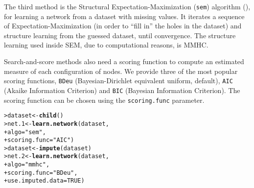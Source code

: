 \documentclass{article}\usepackage[]{graphicx}\usepackage[]{color}
\makeatletter
\newcommand{\hlnum}[1]{\textcolor[rgb]{0.686,0.059,0.569}{#1}}%
\newcommand{\hlstr}[1]{\textcolor[rgb]{0.192,0.494,0.8}{#1}}%
\newcommand{\hlstd}[1]{\textcolor[rgb]{0.345,0.345,0.345}{#1}}%
\newcommand{\hlkwb}[1]{\textcolor[rgb]{0.69,0.353,0.396}{#1}}%
\newcommand{\hlkwc}[1]{\textcolor[rgb]{0.333,0.667,0.333}{#1}}%
\newcommand{\hlkwd}[1]{\textcolor[rgb]{0.737,0.353,0.396}{\textbf{#1}}}%
\newenvironment{kframe}{%
 \def\at@end@of@kframe{}%
 \ifinner\ifhmode%
  \def\at@end@of@kframe{\end{minipage}}%
  \begin{minipage}{\columnwidth}%
 \fi\fi%
 \def\FrameCommand##1{\hskip\@totalleftmargin \hskip-\fboxsep
 \colorbox{shadecolor}{##1}\hskip-\fboxsep
     \hskip-\linewidth \hskip-\@totalleftmargin \hskip\columnwidth}%
 \MakeFramed {\advance\hsize-\width
   \@totalleftmargin\z@ \linewidth\hsize
   \@setminipage}}%
 {\par\unskip\endMakeFramed%
 \at@end@of@kframe}
\newenvironment{knitrout}{}{} %
\makeatother
\begin{document}
The third method is the Structural Expectation-Maximization (\texttt{sem}) algorithm (\citet{friedman1997learning,friedman1998bayesian}),
for learning a network from a dataset with missing values. It iterates a sequence of Expectation-Maximization (in order to ``fill in''
the holes in the dataset) and structure learning from the guessed dataset, until convergence. The structure learning used inside SEM,
due to computational reasons, is MMHC.

Search-and-score methods also need a scoring function to compute an estimated measure of each configuration of nodes.
We provide three of the most popular scoring functions, \texttt{BDeu} (Bayesian-Dirichlet equivalent uniform, default),
\texttt{AIC} (Akaike Information Criterion) and \texttt{BIC} (Bayesian Information Criterion). The scoring function
can be chosen using the \texttt{scoring.func} parameter.

\begin{knitrout}
\color{fgcolor}\begin{kframe}
\begin{alltt}
\hlstd{> }\hlstd{dataset} \hlkwb{<-} \hlkwd{child}\hlstd{()}
\hlstd{> }\hlstd{net.1}   \hlkwb{<-} \hlkwd{learn.network}\hlstd{(dataset,}
\hlstd{+ }                         \hlkwc{algo} \hlstd{=} \hlstr{"sem"}\hlstd{,}
\hlstd{+ }                         \hlkwc{scoring.func} \hlstd{=} \hlstr{"AIC"}\hlstd{)}
\hlstd{> }\hlstd{dataset} \hlkwb{<-} \hlkwd{impute}\hlstd{(dataset)}
\hlstd{> }\hlstd{net.2}   \hlkwb{<-} \hlkwd{learn.network}\hlstd{(dataset,}
\hlstd{+ }                         \hlkwc{algo} \hlstd{=} \hlstr{"mmhc"}\hlstd{,}
\hlstd{+ }                         \hlkwc{scoring.func} \hlstd{=} \hlstr{"BDeu"}\hlstd{,}
\hlstd{+ }                         \hlkwc{use.imputed.data} \hlstd{=} \hlnum{TRUE}\hlstd{)}
\end{alltt}
\end{kframe}
\end{knitrout}
\end{document}

